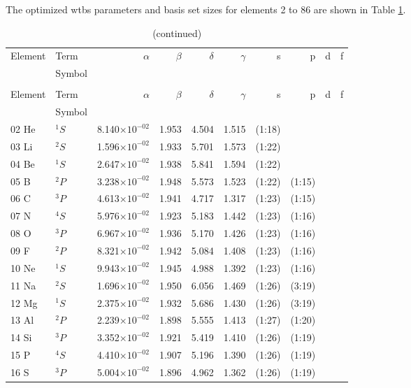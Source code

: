 \documentclass[12pt]{report}
\begin{document}
The optimized wtbs parameters and basis set sizes for elements 2 to 86 are shown in Table \ref{tab:BStab}.

\singlespacing
\begin{longtable}{l l r r r r r r r r}
\caption{Basis sets optimized using rwtbs}\label{tab:BStab} \\
	Element	&	Term		&	$\alpha$	&	$\beta$	&	$\delta$	&	$\gamma$	&	s	&	p	&	d	&	f	\\
			&	Symbol	&			&			&			&				&		&		&		&		\\
\hline
\endfirsthead
\caption[]{(continued)}\\
	Element	&	Term		&	$\alpha$	&	$\beta$	&	$\delta$	&	$\gamma$	&	s	&	p	&	d	&	f	\\
			&	Symbol	&			&			&			&				&		&		&		&		\\
\hline
\endhead
02 He & $^{1}S$ & 8.140$\times10^{-02}$ & 1.953 & 4.504 & 1.515 & (1:18) \\
03 Li & $^{2}S$ & 1.596$\times10^{-02}$ & 1.933 & 5.701 & 1.573 & (1:22)  \\
04 Be & $^{1}S$ & 2.647$\times10^{-02}$ & 1.938 & 5.841 & 1.594 & (1:22) \\	
05 B & $^{2}P$ & 3.238$\times10^{-02}$ & 1.948 & 5.573 & 1.523 & (1:22) & (1:15) \\
06 C & $^{3}P$ & 4.613$\times10^{-02}$ & 1.941 & 4.717 & 1.317 & (1:23) & (1:15) \\
07 N & $^{4}S$ & 5.976$\times10^{-02}$ & 1.923 & 5.183 & 1.442 & (1:23) & (1:16)  \\
08 O & $^{3}P$ & 6.967$\times10^{-02}$ & 1.936 & 5.170 & 1.426 & (1:23) & (1:16) \\
09 F & $^{2}P$ & 8.321$\times10^{-02}$ & 1.942 & 5.084 & 1.408 & (1:23) & (1:16) \\
10 Ne & $^{1}S$ & 9.943$\times10^{-02}$ & 1.945 & 4.988 & 1.392 & (1:23) & (1:16) \\
11 Na & $^{2}S$ & 1.696$\times10^{-02}$ & 1.950 & 6.056 & 1.469 & (1:26) & (3:19)  \\
12 Mg & $^{1}S$ & 2.375$\times10^{-02}$ & 1.932 & 5.686 & 1.430 & (1:26) & (3:19) \\
13 Al & $^{2}P$ & 2.239$\times10^{-02}$ & 1.898 & 5.555 & 1.413 & (1:27) & (1:20)  \\
14 Si & $^{3}P$ & 3.352$\times10^{-02}$ & 1.921 & 5.419 & 1.410 & (1:26) & (1:19)  \\
15 P & $^{4}S$ & 4.410$\times10^{-02}$ & 1.907 & 5.196 & 1.390 & (1:26) & (1:19)     \\
16 S & $^{3}P$ & 5.004$\times10^{-02}$ & 1.896 & 4.962 & 1.362 & (1:26) & (1:19)     \\

\end{longtable}
\end{document}
